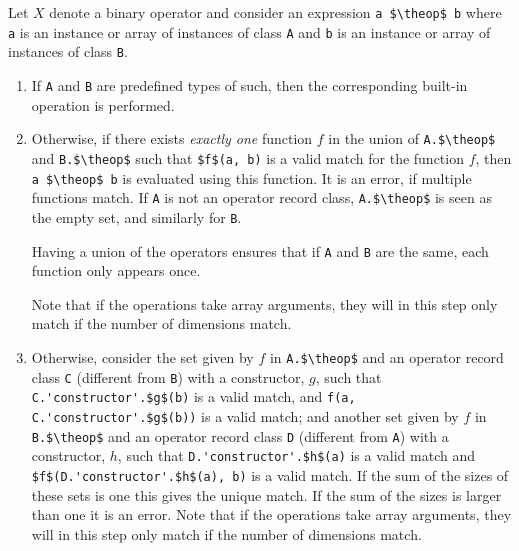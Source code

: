 \newcommand{\theop}{X}

Let $\theop$ denote a binary operator and consider an expression
\lstinline!a $\theop$ b! where \lstinline!a! is an instance or array of instances of
class \lstinline!A! and \lstinline!b! is an instance or array of instances of
class \lstinline!B!.

\begin{enumerate}
\item\label{overloaded-binary-predefined}
  If \lstinline!A! and \lstinline!B! are predefined types of such, then the corresponding built-in operation is performed.
\item
  Otherwise, if there exists \emph{exactly one} function $f$ in the
  union of \lstinline!A.$\theop$! and \lstinline!B.$\theop$! such that
  \lstinline!$f$(a, b)! is a valid match for the function $f$, then
  \lstinline!a $\theop$ b! is evaluated using this function. It is an error, if
  multiple functions match. If \lstinline!A! is not an operator record class, \lstinline!A.$\theop$!
  is seen as the empty set, and similarly for \lstinline!B!.
  \begin{nonnormative}
  Having a union of the operators ensures that if \lstinline!A! and \lstinline!B! are the same, each function only appears once.
  \end{nonnormative}
  Note that if the operations take array arguments, they will in this step only match if the number of dimensions match.
\item
  Otherwise, consider the set given by $f$ in \lstinline!A.$\theop$!
  and an operator record class \lstinline!C! (different from \lstinline!B!) with a
  constructor, $g$, such that \lstinline!C.'constructor'.$g$(b)! is a valid match, and
  \lstinline!f(a, C.'constructor'.$g$(b))! is a valid match; and another set given by
  $f$ in \lstinline!B.$\theop$! and an operator record class \lstinline!D!
  (different from \lstinline!A!) with a constructor, $h$, such that
  \lstinline!D.'constructor'.$h$(a)! is a valid match and \lstinline!$f$(D.'constructor'.$h$(a), b)!
  is a valid match. If the sum of the sizes of these sets is one this
  gives the unique match. If the sum of the sizes is larger than one it
  is an error.
  Note that if the operations take array arguments, they will in this step only match if the number of dimensions match.
\begin{nonnormative}

\end{nonnormative}
\end{enumerate}
